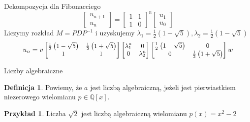 \documentclass[handout]{beamer}
\def\Q{\mathbb{Q}}
\theoremstyle{definition}
\newtheorem*{definicja}{Definicja}
\newtheorem*{przyklad}{Przykład}
\begin{document}
\begin{frame}{Dekompozycja dla Fibonacciego}
    \begin{equation*}
        \begin{bmatrix}
        u_{n+1} \\
        u_{n}
        \end{bmatrix}
        = 
        \begin{bmatrix}
        1 & 1\\
        1 & 0
        \end{bmatrix}^n
        \begin{bmatrix}
        u_1 \\
        u_0 
        \end{bmatrix}

    \end{equation*}
    Liczymy rozkład $M = PDP^{-1}$ i uzyskujemy $\lambda_1 =  \frac{1}{2} \left(1-\sqrt{5}\right), \lambda_2 = \frac{1}{2} \left(1-\sqrt{5}\right) $
\begin{equation*}
    \small u_n = v
        \begin{bmatrix}
            \frac{1}{2} \left(1-\sqrt{5}\right) & \frac{1}{2} \left(1+\sqrt{5}\right) \\
         1 & 1 \\
        \end{bmatrix}
        \begin{bmatrix}
           \lambda_1^{n} & 0 \\
            0 & \lambda_2^{n}
        \end{bmatrix}
        \begin{bmatrix}
            \frac{1}{2} \left(1-\sqrt{5}\right) & 0 \\
            0 & \frac{1}{2} \left(1+\sqrt{5}\right) \\
        \end{bmatrix} w

    \end{equation*}
\end{frame}

\begin{frame}{Liczby algebraiczne}
\begin{definicja}
    Powiemy, że $a $ jest liczbą algebraiczną, jeżeli jest pierwiastkiem niezerowego wielomianu $p \in \Q[x]$. 
\end{definicja}

\begin{przyklad}
    Liczba $\sqrt{2}$ jest liczbą algebraiczną wielomianu $p(x) = x^{2} - 2$
\end{przyklad}

\end{frame}
\end{document}

